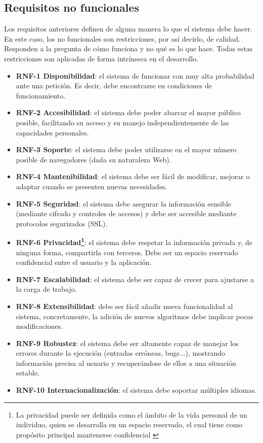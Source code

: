 \subsection{Requisitos no funcionales}
Los requisitos anteriores definen de alguna manera lo que el sistema debe hacer.
En este caso, los no funcionales son restricciones, por así decirlo, de calidad.
Responden a la pregunta de cómo funciona y no qué es lo que hace. Todas estas
restricciones son aplicadas de forma intrínseca en el desarrollo.

\begin{itemize}
	\item \textbf{RNF-1 Disponibilidad}: el sistema de funcionar con muy alta
	probabilidad ante una petición. Es decir, debe encontrarse en condiciones de
	funcionamiento.
	\item \textbf{RNF-2 Accesibilidad}: el sistema debe poder abarcar el mayor
	público posible, facilitando su acceso y su manejo independientemente de las
	capacidades personales.
    \item \textbf{RNF-3 Soporte}: el sistema debe poder utilizarse en el mayor
    número posible de navegadores (dada su naturaleza Web).
	\item \textbf{RNF-4 Mantenibilidad}: el sistema debe ser fácil de modificar,
	mejorar o adaptar cuando se presenten nuevas necesidades.
	\item \textbf{RNF-5 Seguridad}: el sistema debe asegurar la información
	sensible (mediante cifrado y controles de accesos) y debe ser accesible
	mediante protocolos segurizados (SSL).
	\item \textbf{RNF-6 Privacidad\footnote{La privacidad puede ser definida
	como el ámbito de la vida personal de un individuo, quien se desarrolla en
	un espacio reservado, el cual tiene como propósito principal mantenerse
	confidencial \cite{eswiki:148719517}}}: el sistema debe respetar la
	información privada y, de ninguna forma, compartirla con terceros. Debe ser
	un espacio reservado confidencial entre el usuario y la aplicación.
	\item \textbf{RNF-7 Escalabilidad}: el sistema debe ser capaz de crecer para
	ajustarse a la carga de trabajo.
	\item \textbf{RNF-8 Extensibilidad}: debe ser fácil añadir nueva
	funcionalidad al sistema, concretamente, la adición de nuevos algoritmos
	debe implicar pocas modificaciones.
	\item \textbf{RNF-9 Robustez}: el sistema debe ser altamente capaz de
	manejar los errores durante la ejecución (entradas erróneas, bugs...),
	mostrando información precisa al usuario y recuperándose de ellos a una
	situación estable.
	\item \textbf{RNF-10 Internacionalización}: el sistema debe soportar múltiples idiomas.

\end{itemize}

